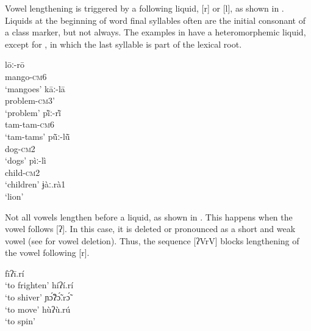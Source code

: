 \documentclass[output=paper]{langscibook}
\begin{document}
Vowel lengthening is triggered by a following liquid, [r] or [l], as shown in . Liquids at the beginning of word final syllables often are the initial consonant of a class marker, but not always. The examples in  have a heteromorphemic liquid, except for , in which the last syllable is part of the lexical root. 
 
 \begin{exe}
     \ex \label{ex:traore:vowelLengtheningExamples:9}
     \begin{multicols}{2}
        \begin{xlist}
            \ex \gll lōː-rō\\
            mango-\textsc{cm}6\\
            \trans `mangoes'
            \ex \gll kāː-lā\\
            problem-\textsc{cm}3'\\
            \trans `problem'
            \ex \gll pĩ̀ː-rĩ̀   \\
            tam-tam-\textsc{cm}6\\
            \trans `tam-tams'
            \columnbreak
            \ex \gll pũ̄ː-lũ̄ \\
            dog-\textsc{cm}2\\
            \trans `dogs'
            \ex \gll pìː-lì\\
            child-\textsc{cm}2\\
            \trans `children'
            \ex  ɉàː.rà1   \label{ex:traore:vowelLengtheningExamples:9f}\\
            `lion'
        \end{xlist}
     \end{multicols}
 \end{exe}
 
Not all vowels lengthen before a liquid, as shown in . This happens when the vowel follows [ʔ]. In this case, it is deleted or pronounced as a short and weak vowel (see 
 for vowel deletion). Thus, the sequence [ʔVrV] blocks lengthening of the vowel following [r]. 

 \begin{exe}\setlength{\multicolsep}{0pt}
    \ex \label{ex:traore:lackOfVowelLengthening:10}
    \begin{multicols}{2}
        \begin{xlist}
            \ex fīʔī.rí\\
            `to frighten'
            \ex  híʔí.rí\\
            `to shiver'
            \columnbreak
            \ex ɲɔ̃́ʔɔ̃́.rɔ̃́\\
            `to move'
            \ex hùʔù.rú\\
            `to spin'
        \end{xlist}
    \end{multicols}
 \end{exe}
\end{document}
